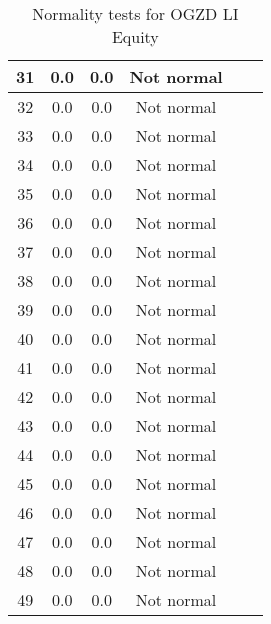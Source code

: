 \begin{table}[h]
\begin{tabular}{|c|c|c|c|c|c|}
		31 & 0.0 & 0.0 & Not normal\\\hline
		32 & 0.0 & 0.0 & Not normal\\\hline
		33 & 0.0 & 0.0 & Not normal\\\hline
		34 & 0.0 & 0.0 & Not normal\\\hline
		35 & 0.0 & 0.0 & Not normal\\\hline
		36 & 0.0 & 0.0 & Not normal\\\hline
		37 & 0.0 & 0.0 & Not normal\\\hline
		38 & 0.0 & 0.0 & Not normal\\\hline
		39 & 0.0 & 0.0 & Not normal\\\hline
		40 & 0.0 & 0.0 & Not normal\\\hline
		41 & 0.0 & 0.0 & Not normal\\\hline
		42 & 0.0 & 0.0 & Not normal\\\hline
		43 & 0.0 & 0.0 & Not normal\\\hline
		44 & 0.0 & 0.0 & Not normal\\\hline
		45 & 0.0 & 0.0 & Not normal\\\hline
		46 & 0.0 & 0.0 & Not normal\\\hline
		47 & 0.0 & 0.0 & Not normal\\\hline
		48 & 0.0 & 0.0 & Not normal\\\hline
		49 & 0.0 & 0.0 & Not normal\\\hline
	\end{tabular}
	\caption{Normality tests for OGZD LI Equity}
	\label{tab:normality_tests_OGZD_}
\end{table}
